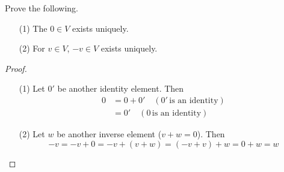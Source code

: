 \documentclass[a4paper, 10pt]{article}
\begin{document}
\begin{exer}
    Prove the following.
    \begin{itemize}
        \item[(1)] The  $0 \in V$ exists uniquely.
        \item[(2)] For $v \in V$,  $-v \in V$ exists uniquely.
    \end{itemize}
\end{exer}
\begin{proof}
    \begin{itemize}
        \item[(1)] Let $0'$ be another identity element. Then
        \begin{align*}
            0 &= 0 + 0' \quad (0' \, \text{is an identity}) \\
            &= 0' \quad (0 \, \text{is an identity})
        \end{align*}
        \item[(2)] Let $w$ be another inverse element ($v + w = 0$). Then
        \[ -v = -v + 0 = -v + (v + w) = (-v + v) + w = 0 + w = w \]
    \end{itemize}
\end{proof}
\newpage

\end{document}
